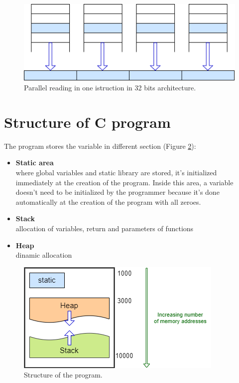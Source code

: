 \begin{figure}[h]
\centering
\includegraphics[scale=0.68]{Images/Programming/parallel_reading}
\caption{\footnotesize{Parallel reading in one istruction in 32 bits architecture.}}\label{parallel}
\end{figure}

\vspace{3cm}
\section{Structure of C program}
The program stores the variable in different section (Figure \ref{program}):
\begin{itemize}
\item{\textbf{Static area}\\
where global variables and static library are stored, it's initialized immediately at the creation of the program. Inside this area, a variable doesn't need to be initialized by the programmer because it's done automatically at the creation of the program with all zeroes.}
\item{\textbf{Stack}\\
allocation of variables, return and parameters of functions}
\item{\textbf{Heap}\\
dinamic allocation }
\end{itemize}

\begin{figure}[h]
\centering
\includegraphics[scale=0.68]{Images/Programming/program}
\caption{\footnotesize{Structure of the program.}}\label{program}
\end{figure}